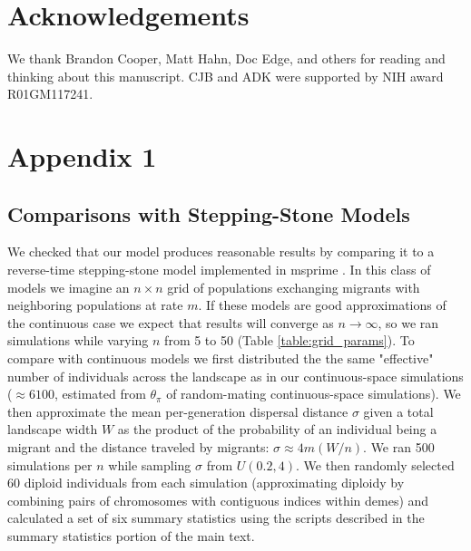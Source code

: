 \documentclass[10pt,twoside,lineno,hidelinks]{preprint}
\begin{document}
\section{Acknowledgements}
We thank Brandon Cooper, Matt Hahn, Doc Edge, and others for reading and thinking about this manuscript. 
CJB and ADK were supported by NIH award R01GM117241. 





\beginappendix
\section{Appendix 1}

\subsection{Comparisons with Stepping-Stone Models}
We checked that our model produces reasonable results by comparing it to a reverse-time stepping-stone model implemented in msprime \citep{Kelleher2016}. In this class of models we imagine an $n \times n$ grid of populations exchanging migrants with neighboring populations at rate $m$. If these models are good approximations of the continuous case we expect that results will converge as $n \to \infty$, so we ran simulations while varying $n$ from 5 to 50 (Table \ref{table:grid_params}). To compare with continuous models we first distributed the the same "effective" number of individuals across the landscape as in our continuous-space simulations ($\approx 6100$, estimated from $\theta_{\pi}$ of random-mating continuous-space simulations). We then approximate the mean per-generation dispersal distance $\sigma$ given a total landscape width $W$ as the product of the probability of an individual being a migrant and the distance traveled by migrants: $\sigma \approx 4m(W/n)$. We ran 500 simulations per $n$ while sampling $\sigma$ from $U(0.2,4)$. We then randomly selected 60 diploid individuals from each simulation (approximating diploidy by combining pairs of chromosomes with contiguous indices within demes) and calculated a set of six summary statistics using the scripts described in the summary statistics portion of the main text. 
\end{document}
